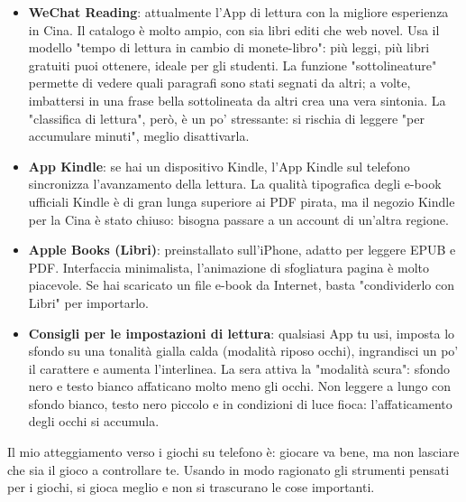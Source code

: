 \begin{itemize}
  \item \textbf{WeChat Reading}: attualmente l'App di lettura con la migliore esperienza in Cina. Il catalogo è molto ampio, con sia libri editi che web novel. Usa il modello "tempo di lettura in cambio di monete-libro": più leggi, più libri gratuiti puoi ottenere, ideale per gli studenti. La funzione "sottolineature" permette di vedere quali paragrafi sono stati segnati da altri; a volte, imbattersi in una frase bella sottolineata da altri crea una vera sintonia. La "classifica di lettura", però, è un po' stressante: si rischia di leggere "per accumulare minuti", meglio disattivarla.
  \item \textbf{App Kindle}: se hai un dispositivo Kindle, l'App Kindle sul telefono sincronizza l'avanzamento della lettura. La qualità tipografica degli e-book ufficiali Kindle è di gran lunga superiore ai PDF pirata, ma il negozio Kindle per la Cina è stato chiuso: bisogna passare a un account di un'altra regione.
  \item \textbf{Apple Books (Libri)}: preinstallato sull'iPhone, adatto per leggere EPUB e PDF. Interfaccia minimalista, l'animazione di sfogliatura pagina è molto piacevole. Se hai scaricato un file e-book da Internet, basta "condividerlo con Libri" per importarlo.
  \item \textbf{Consigli per le impostazioni di lettura}: qualsiasi App tu usi, imposta lo sfondo su una tonalità gialla calda (modalità riposo occhi), ingrandisci un po' il carattere e aumenta l'interlinea. La sera attiva la "modalità scura": sfondo nero e testo bianco affaticano molto meno gli occhi. Non leggere a lungo con sfondo bianco, testo nero piccolo e in condizioni di luce fioca: l'affaticamento degli occhi si accumula.
\end{itemize}


Il mio atteggiamento verso i giochi su telefono è: giocare va bene, ma non lasciare che sia il gioco a controllare te. Usando in modo ragionato gli strumenti pensati per i giochi, si gioca meglio e non si trascurano le cose importanti.

